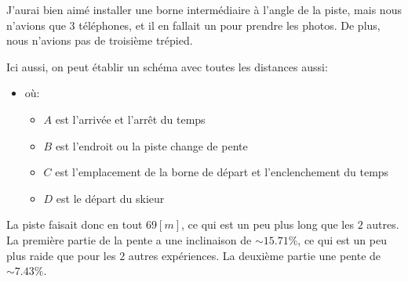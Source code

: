 \documentclass{article}
\begin{document}
J'aurai bien aimé installer une borne intermédiaire à l'angle de la piste, mais nous n'avions que $3$ téléphones, et il en fallait un pour prendre les photos. De plus, nous n'avions pas de troisième trépied.

\vspace{0.3cm}

Ici aussi, on peut établir un schéma avec toutes les distances aussi:

\begin{center}
\end{center}

\begin{itemize}
    \item où:
    \begin{itemize}
        \item $A$ est l'arrivée et l'arrêt du temps
        \item $B$ est l'endroit ou la piste change de pente
        \item $C$ est l'emplacement de la borne de départ et l'enclenchement du temps
        \item $D$ est le départ du skieur
    \end{itemize}
\end{itemize}

La piste faisait donc en tout $69[m]$, ce qui est un peu plus long que les $2$ autres. La première partie de la pente a une inclinaison de $\sim 15.71\%$, ce qui est un peu plus raide que pour les $2$ autres expériences. La deuxième partie une pente de $\sim 7.43\%$.
\end{document}
